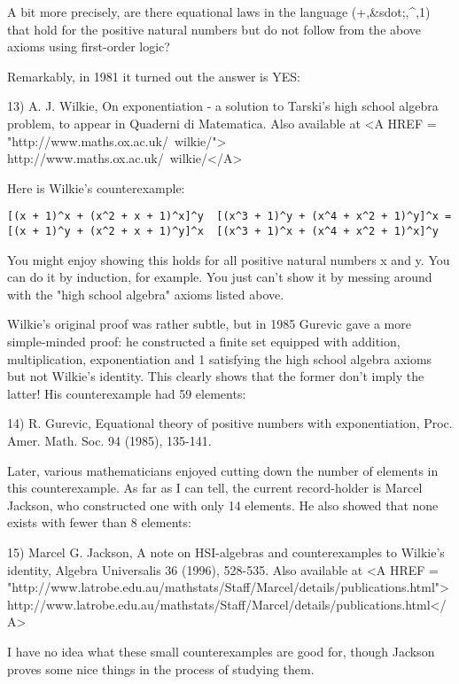 A bit more precisely, are there equational laws in the language (+,&sdot;,^,1)
that hold for the positive natural numbers but do not follow from the 
above axioms using first-order logic?  

Remarkably, in 1981 it turned out the answer is YES:
	    
13) A. J. Wilkie, On exponentiation - a solution to Tarski's 
high school algebra problem, to appear in Quaderni di 
Matematica.   Also available at <A HREF = "http://www.maths.ox.ac.uk/~wilkie/"> http://www.maths.ox.ac.uk/~wilkie/</A>

Here is Wilkie's counterexample:

\begin{verbatim}
[(x + 1)^x + (x^2 + x + 1)^x]^y  [(x^3 + 1)^y + (x^4 + x^2 + 1)^y]^x =
[(x + 1)^y + (x^2 + x + 1)^y]^x  [(x^3 + 1)^x + (x^4 + x^2 + 1)^x]^y 
\end{verbatim}
    
You might enjoy showing this holds for all positive natural numbers x
and y.  You can do it by induction, for example.  You just can't show it
by messing around with the "high school algebra" axioms listed above.

Wilkie's original proof was rather subtle, but in 1985 Gurevic gave a
more simple-minded proof: he constructed a finite set equipped with
addition, multiplication, exponentiation and 1 satisfying the high
school algebra axioms but not Wilkie's identity.  This clearly shows
that the former don't imply the latter!  His counterexample had 59
elements:

14) R. Gurevic, Equational theory of positive numbers with exponentiation,
Proc. Amer. Math. Soc. 94 (1985), 135-141.

Later, various mathematicians enjoyed cutting down the number of
elements in this counterexample.   As far as I can tell, the current
record-holder is Marcel Jackson, who constructed one with only 14
elements.  He also showed that none exists with fewer than 8 elements:

15) Marcel G. Jackson, A note on HSI-algebras and counterexamples to 
Wilkie's identity, Algebra Universalis 36 (1996), 528-535.  Also available at 
<A HREF = "http://www.latrobe.edu.au/mathstats/Staff/Marcel/details/publications.html">http://www.latrobe.edu.au/mathstats/Staff/Marcel/details/publications.html</A>

I have no idea what these small counterexamples are good for, though
Jackson proves some nice things in the process of studying them.  

